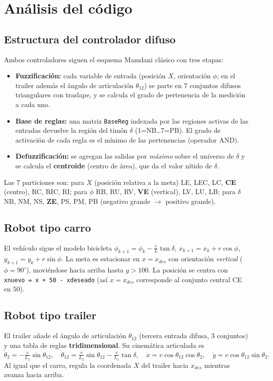 \documentclass[11pt,a4paper]{article}
\newcommand{\code}[1]{\texttt{\small #1}}
\begin{document}
\section{Análisis del código}

\subsection{Estructura del controlador difuso}
Ambos controladores siguen el esquema Mamdani clásico con tres etapas:
\begin{itemize}
  \item \textbf{Fuzzificación:} cada variable de entrada (posición $X$, orientación
        $\phi$; en el trailer además el ángulo de articulación $\theta_{12}$) se parte en
        7 conjuntos difusos triangulares con traslape, y se calcula el grado de
        pertenencia de la medición a cada uno.
  \item \textbf{Base de reglas:} una matriz \code{BaseReg} indexada por las regiones
        activas de las entradas devuelve la región del timón $\delta$ (1=NB\dots7=PB). El
        grado de activación de cada regla es el mínimo de las pertenencias (operador AND).
  \item \textbf{Defuzzificación:} se agregan las salidas por \emph{máximo} sobre el
        universo de $\delta$ y se calcula el \textbf{centroide} (centro de área), que da
        el valor nítido de $\delta$.
\end{itemize}
Las 7 particiones son: para $X$ (posición relativa a la meta) LE, LEC, LC, \textbf{CE}
(centro), RC, RIC, RI; para $\phi$ RB, RU, RV, \textbf{VE} (vertical), LV, LU, LB; para
$\delta$ NB, NM, NS, \textbf{ZE}, PS, PM, PB (negativo grande $\to$ positivo grande).

\subsection{Robot tipo carro}
El vehículo sigue el modelo bicicleta $\phi_{k+1}=\phi_k-\tfrac{r}{L}\tan\delta$,
$x_{k+1}=x_k+r\cos\phi$, $y_{k+1}=y_k+r\sin\phi$. La meta es estacionar en $x=x_{des}$
con orientación \emph{vertical} ($\phi=90^\circ$), moviéndose hacia arriba hasta $y>100$.
La posición se centra con \code{xnuevo = x + 50 - xdeseado} (así $x=x_{des}$ corresponde
al conjunto central CE en $50$).

\subsection{Robot tipo trailer}
El trailer añade el ángulo de articulación $\theta_{12}$ (tercera entrada difusa, 3
conjuntos) y una tabla de reglas \textbf{tridimensional}. Su cinemática articulada es
\[
  \dot\theta_2=-\tfrac{v}{L_2}\sin\theta_{12},\quad
  \dot\theta_{12}=\tfrac{v}{L_2}\sin\theta_{12}-\tfrac{v}{L_1}\tan\delta,\quad
  \dot x=v\cos\theta_{12}\cos\theta_2,\quad \dot y=v\cos\theta_{12}\sin\theta_2 .
\]
Al igual que el carro, regula la coordenada $X$ del trailer hacia $x_{des}$ mientras
avanza hacia arriba.
\end{document}
